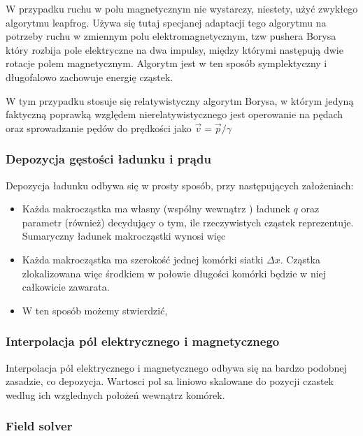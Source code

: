     W przypadku ruchu w polu magnetycznym nie wystarczy, niestety, użyć zwykłego algorytmu leapfrog. %
    Używa się tutaj specjanej adaptacji tego algorytmu na potrzeby ruchu w zmiennym polu elektromagnetycznym,
    tzw pushera %
    Borysa %
    który rozbija pole elektryczne na dwa impulsy, między którymi następują dwie %
    rotacje polem magnetycznym. Algorytm jest w ten sposób symplektyczny %
    i długofalowo zachowuje energię cząstek.

    W tym przypadku stosuje się relatywistyczny algorytm Borysa, w którym jedyną faktyczną poprawką względem
    nierelatywistycznego jest operowanie na pędach oraz sprowadzanie pędów do prędkości jako $\vec{v} = \vec{p} / \gamma$ %

    \subsubsection{Depozycja gęstości ładunku i prądu}
    Depozycja ładunku odbywa się w prosty sposób, przy następujących założeniach:
    \begin{itemize}
        \item Każda makrocząstka ma własny (wspólny wewnątrz ) ładunek $q$ oraz parametr  (również) %
            decydujący o tym, ile rzeczywistych cząstek reprezentuje. Sumaryczny ładunek makrocząstki wynosi więc 
        \item Każda makrocząstka ma szerokość jednej komórki siatki $\Delta x$. Cząstka zlokalizowana więc środkiem
            w połowie długości komórki będzie w niej całkowicie zawarata.
        \item W ten sposób możemy stwierdzić, %


    \end{itemize}
    \subsubsection{Interpolacja pól elektrycznego i magnetycznego}
    Interpolacja pól elektrycznego i magnetycznego odbywa się na bardzo podobnej zasadzie, co depozycja.
    Wartosci pol sa liniowo skalowane do pozycji czastek wedlug ich wzglednych położeń wewnątrz komórek.
    \subsubsection{Field solver} %

